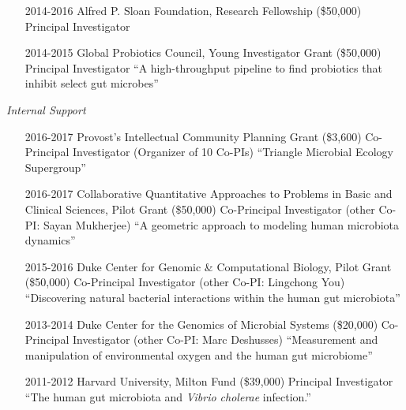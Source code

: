 \documentclass[overlapped,line,11pt]{res}
\begin{document}
\begin{resume}
\begin{itemize}[leftmargin=2cm, style=sameline]
\item[2014-2016] Alfred P. Sloan Foundation, Research Fellowship (\$50,000) \newline Principal Investigator 

\item[2014-2015] Global Probiotics Council, Young Investigator Grant (\$50,000) \newline Principal Investigator 
  \newline ``A high-throughput pipeline to find probiotics that
  inhibit select gut microbes''

\end{itemize}

\emph{Internal Support}
\vspace{.1in}

\begin{itemize}[leftmargin=2cm, style=sameline]

\item[2016-2017]  Provost's Intellectual Community Planning Grant
  (\$3,600) \newline Co-Principal Investigator (Organizer of 10 Co-PIs) \newline ``Triangle Microbial Ecology Supergroup''

\item[2016-2017]  Collaborative Quantitative Approaches to Problems in Basic and Clinical Sciences, Pilot Grant
  (\$50,000) \newline Co-Principal Investigator (other Co-PI:
  Sayan Mukherjee) \newline ``A geometric approach to modeling human microbiota dynamics''

\item[2015-2016] Duke Center for Genomic \& Computational Biology, Pilot Grant
  (\$50,000) \newline Co-Principal Investigator (other Co-PI:
  Lingchong You) \newline ``Discovering natural bacterial interactions
  within the human gut microbiota''

\item[2013-2014] Duke Center for the Genomics of Microbial Systems
  (\$20,000) \newline Co-Principal Investigator (other Co-PI:
  Marc Deshusses) \newline ``Measurement and manipulation of
environmental oxygen and the human gut microbiome''

\item[2011-2012] Harvard University, Milton Fund (\$39,000) \newline
  Principal Investigator \newline ``The human gut microbiota
  and \emph{Vibrio cholerae} infection.''


\end{itemize}
\end{resume}
\end{document}
